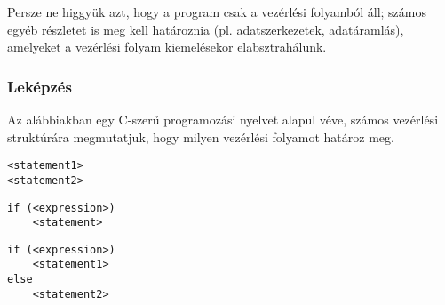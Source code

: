 Persze ne higgyük azt, hogy a program csak a vezérlési folyamból áll; számos egyéb részletet is meg kell határoznia (pl. adatszerkezetek, adatáramlás), amelyeket a vezérlési folyam kiemelésekor elabsztrahálunk.




% 
% 






\subsubsection{Leképzés}

Az alábbiakban egy C-szerű programozási nyelvet alapul véve, számos vezérlési struktúrára megmutatjuk, hogy milyen vezérlési folyamot határoz meg. 

\begin{minipage}{\balhasab}
\begin{lstlisting}
<statement1>
<statement2>
\end{lstlisting}
\end{minipage}
\begin{minipage}{\jobbhasab}
\end{minipage}



\begin{minipage}{\balhasab}
\begin{lstlisting}
if (<expression>)
	<statement>
\end{lstlisting}
\end{minipage}
\begin{minipage}{\jobbhasab}
\end{minipage}



\begin{minipage}{\balhasab}
\begin{lstlisting}
if (<expression>)
	<statement1>
else
	<statement2>
\end{lstlisting}
\end{minipage}
\begin{minipage}{\jobbhasab}
\end{minipage}

